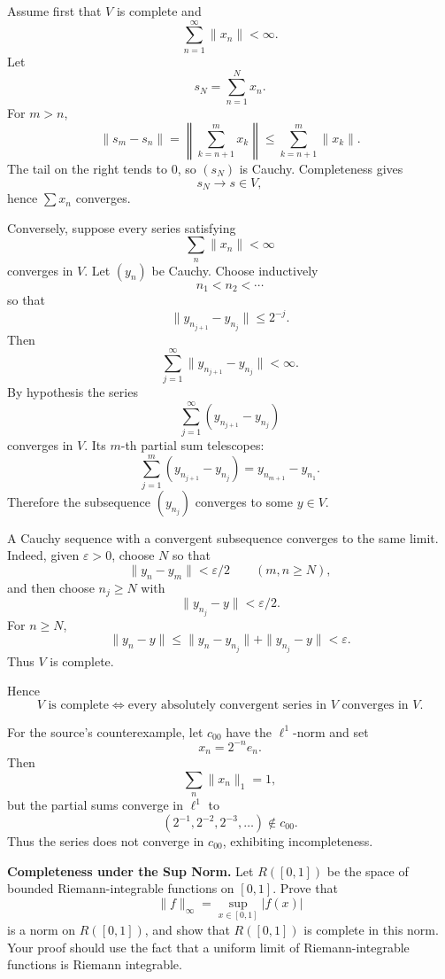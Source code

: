 \begin{solution}
Assume first that \(V\) is complete and
\[
\sum_{n=1}^{\infty}\|x_n\|<\infty.
\]
Let
\[
s_N=\sum_{n=1}^{N}x_n.
\]
For \(m>n\),
\[
\|s_m-s_n\|
=
\left\|
\sum_{k=n+1}^{m}x_k
\right\|
\le
\sum_{k=n+1}^{m}\|x_k\|.
\]
The tail on the right tends to \(0\), so \((s_N)\) is Cauchy. Completeness gives
\[
s_N\to s\in V,
\]
hence \(\sum x_n\) converges.

Conversely, suppose every series satisfying
\[
\sum_n\|x_n\|<\infty
\]
converges in \(V\). Let \((y_n)\) be Cauchy. Choose inductively
\[
n_1<n_2<\cdots
\]
so that
\[
\|y_{n_{j+1}}-y_{n_j}\|\le2^{-j}.
\]
Then
\[
\sum_{j=1}^{\infty}
\|y_{n_{j+1}}-y_{n_j}\|
<\infty.
\]
By hypothesis the series
\[
\sum_{j=1}^{\infty}
(y_{n_{j+1}}-y_{n_j})
\]
converges in \(V\). Its \(m\)-th partial sum telescopes:
\[
\sum_{j=1}^{m}
(y_{n_{j+1}}-y_{n_j})
=
y_{n_{m+1}}-y_{n_1}.
\]
Therefore the subsequence \((y_{n_j})\) converges to some \(y\in V\).

A Cauchy sequence with a convergent subsequence converges to the same limit. Indeed, given
\(\varepsilon>0\), choose \(N\) so that
\[
\|y_n-y_m\|<\varepsilon/2
\qquad(m,n\ge N),
\]
and then choose \(n_j\ge N\) with
\[
\|y_{n_j}-y\|<\varepsilon/2.
\]
For \(n\ge N\),
\[
\|y_n-y\|
\le
\|y_n-y_{n_j}\|+\|y_{n_j}-y\|
<
\varepsilon.
\]
Thus \(V\) is complete.

Hence
\[
\boxed{
V\text{ is complete}
\iff
\text{every absolutely convergent series in }V\text{ converges in }V.
}
\]

For the source's counterexample, let \(c_{00}\) have the \(\ell^1\)-norm and set
\[
x_n=2^{-n}e_n.
\]
Then
\[
\sum_n\|x_n\|_1=1,
\]
but the partial sums converge in \(\ell^1\) to
\[
(2^{-1},2^{-2},2^{-3},\ldots)\notin c_{00}.
\]
Thus the series does not converge in \(c_{00}\), exhibiting incompleteness.
\end{solution}


\begin{problem}[CP-II-0506]
\label{prob:cp-ii-0506}
\textbf{Completeness under the Sup Norm.}
Let \(R([0,1])\) be the space of bounded Riemann-integrable functions on
\([0,1]\). Prove that
\[
\|f\|_\infty=\sup_{x\in[0,1]}|f(x)|
\]
is a norm on \(R([0,1])\), and show that \(R([0,1])\) is complete in this norm.
Your proof should use the fact that a uniform limit of Riemann-integrable
functions is Riemann integrable.
\end{problem}

